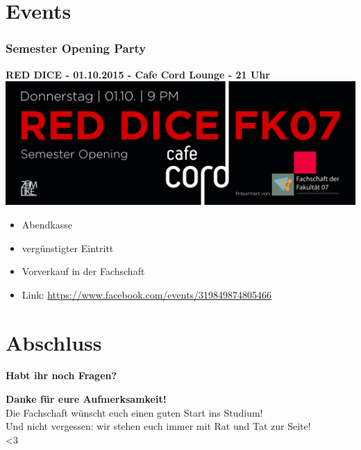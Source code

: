 \documentclass{beamer}
\begin{document}
     \section{Events}
     
     \begin{frame}[t]
     	\frametitle{Semester Opening Party}
     	\textbf{RED DICE - 01.10.2015 - Cafe Cord Lounge - 21 Uhr}
     	\includegraphics[width=1\textwidth]{RedDice.jpg}
     	\begin{itemize}
     		\item Abendkasse 
     		\item vergünstigter Eintritt 
     		\item Vorverkauf in der Fachschaft
     		\item Link: \footnotesize{\url{https://www.facebook.com/events/319849874805466}}
     	\end{itemize}
     \end{frame}
     
     \section{Abschluss}
     
     \begin{frame}
     	\center \textbf{Habt ihr noch Fragen?}
     \end{frame}
    
    \begin{frame}
    	\center \textbf{Danke für eure Aufmerksamkeit!}
    	\\
    	\bigskip
    	Die Fachschaft wünscht euch einen guten Start ins Studium!\\
    	\bigskip
    	Und nicht vergessen: wir stehen euch immer mit Rat und Tat zur Seite!\\ 
    	\textless3
    \end{frame}
    
\end{document}
